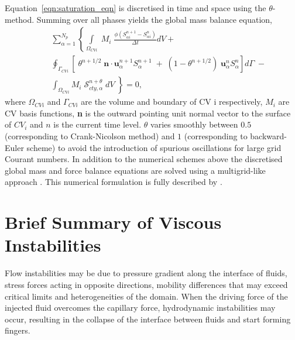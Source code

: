 \documentclass[preprint,authoryear,12pt]{elsarticle}
\newcommand{\red}{\textcolor{red}}
\begin{document}
\noindent Equation~\ref{eqn:saturation_eqn} is discretised in time and space using the $\theta$-method. Summing over all phases yields the global mass balance equation,
\begin{eqnarray}
 && \sum_{\alpha=1}^{N_{p}} \left\{\int\limits_{\Omega_{CVi}} \; M_{i} \; \frac{\phi\left(S_{\alpha i}^{n+1}-S_{\alpha i}^{n}\right)}{\Delta t} dV\right.  + \nonumber\\
 &&  \oint_{\Gamma_{CVi}} \left[\; \theta^{n+1/2}\; {\mathbf n}\cdot {\mathbf u}_{\alpha}^{n+1}S_{\alpha}^{n+1} \; + \; \left(1-\theta^{n+1/2}\right) \; {\mathbf u}_{\alpha}^{n}S_{\alpha}^{n}\right] d\Gamma \;- \nonumber\\
 &&  \left.\int_{\Omega_{CVi}} M_{i} \; \mathcal{S}_{cty,\alpha}^{n+\theta} \; dV\;\right\} =0,
\label{global_mass_balance}
\end{eqnarray}
where $\Omega_{CVi}$ and $\Gamma_{CVi}$ are the volume and boundary of CV i respectively, $M_{i}$ are CV basis functions, \textbf{n} is the outward pointing unit normal vector to the surface of $CV_{i}$ and $n$ is the current time level. $\theta$ varies smoothly between $0.5$ (corresponding to Crank-Nicolson method) and $1$ (corresponding to backward-Euler scheme) to avoid the introduction of spurious oscillations for large grid Courant numbers. In addition to the numerical schemes above the discretised global mass and force balance equations are solved using a multigrid-like approach \citep[see][]{pavlidis2016}. This numerical formulation is fully described by \citet{gomes_2017}\citep[see also][]{salinas2015,adam_2016}. 

\section{Brief Summary of Viscous Instabilities}\label{section:ViscousInstabilities}

\medskip
Flow instabilities may be due to pressure gradient along the interface of fluids, stress forces acting in opposite directions, mobility differences that may exceed critical limits and heterogeneities of the domain. %
When the driving force of the injected fluid overcomes the capillary force, hydrodynamic instabilities may occur, resulting in the collapse of the interface between fluids and start forming fingers. 
\end{document}
